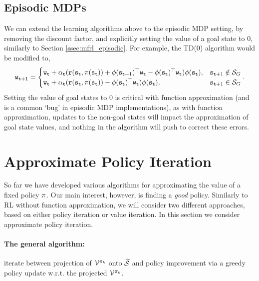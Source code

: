 \subsection{Episodic MDPs}

We can extend the learning algorithms above to the  episodic MDP setting, by removing the discount factor, and explicitly setting the value of a goal state to $0$, similarly to Section \ref{ssec:mfrl_episodic}. For example, the TD(0) algorithm would be modified to,
\begin{equation*}\label{eq:TD_func_approx_ssp}
    {\tt w}_{{\tt t}+1} = \begin{cases}
        {\tt w}_{\tt t} + \alpha_{\tt t} ( {\tt r}({\tt s}_{\tt t},\pi({\tt s}_{\tt t})) +{\phi}({\tt s}_{{\tt t}+1})^\top {\tt w}_{\tt t} - {\phi}({\tt s}_{{\tt t}})^\top {\tt w}_{\tt t}) \phi({\tt s}_{{\tt t}}), & {\tt s}_{{\tt t}+1} \notin \mathcal{S}_G \\
        {\tt w}_{\tt t} + \alpha_{\tt t} ( {\tt r}({\tt s}_{\tt t},\pi({\tt s}_{\tt t})) - {\phi}({\tt s}_{{\tt t}})^\top {\tt w}_{\tt t}) \phi({\tt s}_{{\tt t}}), & {\tt s}_{{\tt t}+1} \in \mathcal{S}_G
    \end{cases}.
\end{equation*}
Setting the value of goal states to $0$ is critical with function approximation (and is a common `bug' in episodic MDP implementations), as with function approximation, updates to the non-goal states will impact the approximation of goal state values, and  nothing in the algorithm will push to correct these errors.

\section{Approximate Policy Iteration}

So far we have developed various algorithms for approximating the value of a fixed policy $\pi$. Our main interest, however, is finding a \textit{good} policy. Similarly to RL without function approximation, we will consider two different approaches, based on either policy iteration or value iteration. In this section we consider approximate policy iteration.


\paragraph{The general algorithm:} iterate between projection of $\mathcal{V}^{\pi_k}$ onto $\widehat{\mathcal{S}}$ and policy improvement via a greedy policy update w.r.t. the projected $\mathcal{V}^{\pi_k}$.

